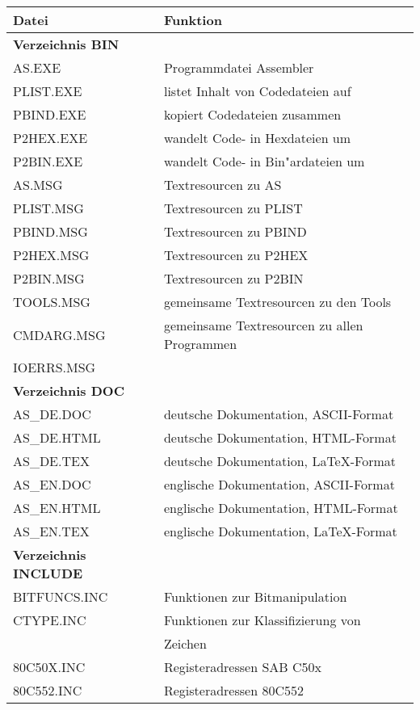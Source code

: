 \documentclass[12pt,a4paper,twoside]{report}
\begin{document}
\begin{center}\begin{longtable}{|l|l|}
\hline
Datei             & Funktion \\
\hline
\hline
\endhead
{\bf Verzeichnis BIN} & \\
\hline
AS.EXE            & Programmdatei Assembler \\
PLIST.EXE         & listet Inhalt von Codedateien auf \\
PBIND.EXE         & kopiert Codedateien zusammen \\
P2HEX.EXE         & wandelt Code- in Hexdateien um \\
P2BIN.EXE         & wandelt Code- in Bin"ardateien um \\
AS.MSG            & Textresourcen zu AS \\
PLIST.MSG         & Textresourcen zu PLIST \\
PBIND.MSG         & Textresourcen zu PBIND \\
P2HEX.MSG         & Textresourcen zu P2HEX \\
P2BIN.MSG         & Textresourcen zu P2BIN \\
TOOLS.MSG         & gemeinsame Textresourcen zu den Tools \\
CMDARG.MSG        & gemeinsame Textresourcen zu allen Programmen \\
IOERRS.MSG        & \\
\hline
{\bf Verzeichnis DOC} & \\
\hline
AS\_DE.DOC        & deutsche Dokumentation, ASCII-Format \\
AS\_DE.HTML       & deutsche Dokumentation, HTML-Format \\
AS\_DE.TEX        & deutsche Dokumentation, LaTeX-Format \\
AS\_EN.DOC        & englische Dokumentation, ASCII-Format \\
AS\_EN.HTML       & englische Dokumentation, HTML-Format \\
AS\_EN.TEX        & englische Dokumentation, LaTeX-Format \\
\hline
{\bf Verzeichnis INCLUDE} & \\
\hline
BITFUNCS.INC      & Funktionen zur Bitmanipulation \\
CTYPE.INC         & Funktionen zur Klassifizierung von \\
                  & Zeichen \\
80C50X.INC        & Registeradressen SAB C50x \\
80C552.INC        & Registeradressen 80C552 \\

\end{longtable}
\end{center}
\end{document}
